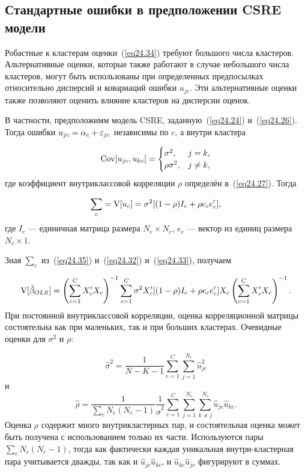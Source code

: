 \subsection*{Стандартные ошибки в предположении CSRE модели}

Робастные к кластерам оценки~(\ref{eq24.34}) требуют большого числа кластеров. Альтернативные оценки, которые также работают в случае небольшого числа кластеров, могут быть использованы при определенных предпосылках относительно дисперсий и ковариаций ошибки $u_{jc}$. Эти альтернативные оценки также позволяют оценить влияние кластеров на дисперсии оценок. 

В частности, предположимм модель CSRE, заданную~(\ref{eq24.24}) и~(\ref{eq24.26}). Тогда ошибки $u_{jc} = \alpha_c + \varepsilon_{jc}$ независимы по $c$, а внутри кластера

$$
\mathrm{Cov}[u_{jc}, u_{kc}]=\begin{cases}
\sigma^2,&\text{$j = k$,}\\
\rho\sigma^2,&\text{$j \ne k$,}
\end{cases}
$$
где коэффициент внутриклассовой корреляции $\rho$ определён в~(\ref{eq24.27}). Тогда

\begin{equation}
\label{eq24.35}
\sum_c = \mathrm{V}[u_c] = \sigma^2 [(1-\rho) I_c + \rho e_c e'_c],
\end{equation}
где $I_c$ --- единичная матрица размера $N_c \times N_c$, $e_c$ --- вектор из единиц размера $N_c \times 1$. 

Зная $\sum_c$  из~(\ref{eq24.35}) и~(\ref{eq24.32}) и~(\ref{eq24.33}), получаем

\begin{equation}
\label{eq24.36}
\mathrm{V}[\hat \beta_{OLS}] = \left( \sum_{c=1}^C X'_c X_c \right)^{-1} \sum_{c=1}^C \sigma^2 X'_c [(1-\rho) I_c + \rho e_c e'_c] X_c \left( \sum_{c=1}^C X'_c X_c \right)^{-1}.
\end{equation}
При постоянной внутриклассовой корреляции, оценка корреляционной матрицы состоятельна как при маленьких, так и при больших кластерах. Очевидные оценки для $\sigma ^2$ и $\rho$:

$$
\hat \sigma^2 = \frac{1}{N-K-1} \sum_{c=1}^C \sum_{j=1}^{N_c} \hat u^2_{jc}
$$
и
$$
\hat \rho = \frac{1}{\sum_c N_c (N_c -1)} \frac{1}{\hat \sigma^2} \sum_{c=1}^C \sum_{j=1}^{N_c} \sum_{k \ne j}^{N_c} \hat u_{jc} \hat u_{kc}.
$$
Оценка $\rho$ содержит много внутрикластерных пар, и состоятельная оценка может быть получена с использованием только их части. Используются пары $\sum_c N_c(N_c - 1)$, тогда как фактически каждая уникальная внутри-кластерная пара учитывается дважды, так как и $\hat u_{jc} \hat u_{kc}$, и $\hat u_{kc} \hat u_{jc}$ фигурируют в суммах. 

